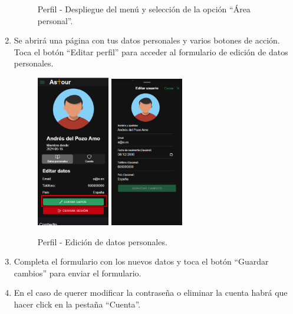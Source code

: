 \begin{enumerate}
\begin{figure}[H]
		      \caption{Perfil - Despliegue del menú y selección de la opción “Área personal”.}
	      \end{figure}
	\item Se abrirá una página con tus datos personales y varios botones de acción. Toca el botón “Editar perfil” para acceder al formulario de edición de datos personales.
	      \begin{figure}[H]
		      \centering
		      \includegraphics[width=0.3\textwidth]{7-Construccion/Manuales/mobile/editar datos.png}
		      \includegraphics[width=0.3\textwidth]{7-Construccion/Manuales/mobile/formulario perfil.png}
		      \caption{Perfil - Edición de datos personales.}
	      \end{figure}
	\item Completa el formulario con los nuevos datos y toca el botón “Guardar cambios” para enviar el formulario.
	\item En el caso de querer modificar la contraseña o eliminar la cuenta habrá que hacer click en la pestaña “Cuenta”.

\end{enumerate}
